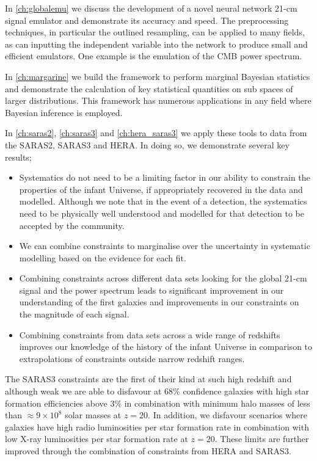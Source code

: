In \cref{ch:globalemu} we discuss the development of a novel neural network 21-cm signal emulator and demonstrate its accuracy and speed. The preprocessing techniques, in particular the outlined resampling, can be applied to many fields, as can inputting the independent variable into the network to produce small and efficient emulators. One example is the emulation of the CMB power spectrum.

In \cref{ch:margarine} we build the framework to perform marginal Bayesian statistics and demonstrate the calculation of key statistical quantities on sub spaces of larger distributions. This framework has numerous applications in any field where Bayesian inference is employed.

In \cref{ch:saras2}, \cref{ch:saras3} and \cref{ch:hera_saras3} we apply these tools to data from the SARAS2, SARAS3 and HERA. In doing so, we demonstrate several key results;

\begin{itemize}
    \item Systematics do not need to be a limiting factor in our ability to constrain the properties of the infant Universe, if appropriately recovered in the data and modelled. Although we note that in the event of a detection, the systematics need to be physically well understood and modelled for that detection to be accepted by the community.
    \item We can combine constraints to marginalise over the uncertainty in systematic modelling based on the evidence for each fit.
    \item Combining constraints across different data sets looking for the global 21-cm signal and the power spectrum leads to significant improvement in our understanding of the first galaxies and improvements in our constraints on the magnitude of each signal.
    \item Combining constraints from data sets across a wide range of redshifts improves our knowledge of the history of the infant Universe in comparison to extrapolations of constraints outside narrow redshift ranges.
\end{itemize}

The SARAS3 constraints are the first of their kind at such high redshift and although weak we are able to disfavour at 68\% confidence galaxies with high star formation efficiencies above $3\%$ in combination with minimum halo masses of less than $\approx 9\times 10^{8}$ solar masses at $z=20$. In addition, we disfavour scenarios where galaxies have high radio luminosities per star formation rate in combination with low X-ray luminosities per star formation rate at $z=20$. These limits are further improved through the combination of constraints from HERA and SARAS3.

